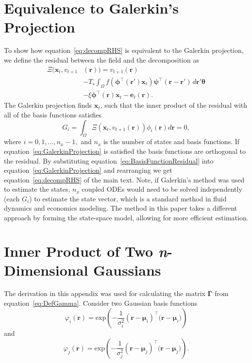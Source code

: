 \documentclass[review,authoryear,3p]{elsarticle}
\begin{document}
\section{Equivalence to Galerkin's Projection}\label{App:Galerkin}
To show how equation~\ref{eq:decompRHS} is equivalent to the Galerkin projection, we define the residual between the field and the decomposition as 
\begin{align}\label{eq:BasisFunctionResidual}
	\Xi(\mathbf{x}_t,v_{t+1}&(\mathbf{r})) = v_{t+1}(\mathbf{r}) \nonumber \\
	&- T_s\int_\Omega{f(\boldsymbol{\phi}^{\top}(\mathbf{r}')\mathbf{x}_t )\boldsymbol{\psi}^{\top}(\mathbf{r}-\mathbf{r}') \, d\mathbf{r}'}\boldsymbol{\theta} \nonumber \\
	&- \xi\boldsymbol{\phi}^{\top}(\mathbf{r})\mathbf{x}_t - \mathbf{e}_t(\mathbf{r}).
\end{align} 
The Galerkin projection finds $\mathbf{x}_t$, such that the inner product of the residual with all of the basis functions satisfies
\begin{equation}\label{eq:GalerkinProjection}
	G_i = \int_{\Omega}\Xi(\mathbf{x}_t,v_{t+1}(\mathbf{r})) \phi_i(\mathbf{r}) d\mathbf{r} = 0,
\end{equation}
where $i=0,1,\hdots,n_x-1,$ and $n_x$ is the number of states and basis functions. If equation~\ref{eq:GalerkinProjection} is satisfied the basis functions are orthogonal to the residual. By substituting equation~\ref{eq:BasisFunctionResidual} into equation~\ref{eq:GalerkinProjection} and rearranging we get equation~\ref{eq:decompRHS} of the main text. Note, if Galerkin's method was used to estimate the states, $n_x$ coupled ODEs would need to be solved independently (each $G_i$) to estimate the state vector, which is a standard method in fluid dynamics and economics modeling. The method in this paper takes a different approach by forming the state-space model, allowing for more efficient estimation.

\section{Inner Product of Two \emph{n}-Dimensional Gaussians}\label{App:InnerProdOfGaussians}
The derivation in this appendix was used for calculating the matrix $\mathbf \Gamma$ from equation~\ref{eq:DefGamma}. Consider two Gaussian basis functions
\begin{equation}\label{eq:n_dimensional_Gaussian1}
 \varphi_i(\mathbf r)=\mathrm{exp}\left({-\frac{1}{\sigma_i^2} (\mathbf r-\boldsymbol \mu_i)^\top(\mathbf r-\boldsymbol \mu_i})\right)
\end{equation}
and 
\begin{equation}\label{eq:n_dimensional_Gaussian2}
\varphi_j(\mathbf r)=\mathrm{exp}\left({-\frac{1}{\sigma_j^2} (\mathbf r-\boldsymbol \mu_j)^\top(\mathbf r-\boldsymbol \mu_j})\right).
\end{equation}
\end{document}

